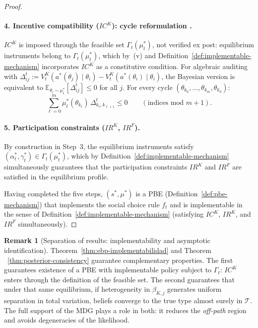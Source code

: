 \documentclass[ecta,nameyear,final,supplement]{econsocart}
\numberwithin{equation}{section}
\numberwithin{table}{section}
\theoremstyle{definition}
\newtheorem{remark}[theorem]{Remark}
\begin{document}
\begin{proof}
\paragraph{4. Incentive compatibility ($IC^K$): cycle reformulation
\citep{Rochet1987}.}
$IC^K$ is imposed through the feasible set $\Gamma_t(\mu_t^\ast)$, not verified
ex post: equilibrium instruments belong to $\Gamma_t(\mu_t^\ast)$, which by~(v)
and Definition~\ref{def:implementable-mechanism} incorporates $IC^K$ as a
constitutive condition. For algebraic auditing with
$\Delta_{ij}^t:=V^K_t(a^\ast(\theta_j)\mid\theta_i)
-V^K_t(a^\ast(\theta_i)\mid\theta_i)$, the Bayesian version is equivalent to
$\mathbb{E}_{\theta_i\sim\mu_t^\ast}[\Delta_{ij}^t]\le 0$ for all $j$.
For every cycle $(\theta_{k_0},\ldots,\theta_{k_m},\theta_{k_0})$:
\[
\sum_{\ell=0}^{m}
\mu_t^\ast(\theta_{k_\ell})\,\Delta_{k_\ell,k_{\ell+1}}^t\le 0
\qquad(\text{indices mod }m+1).
\]

\paragraph{5. Participation constraints ($IR^K$, $IR^F$).}
By construction in Step~3, the equilibrium instruments satisfy $(\alpha_t^\ast,\gamma_t^\ast)\in\Gamma_t(\mu_t^\ast)$,
which by Definition~\ref{def:implementable-mechanism} simultaneously guarantees that the participation constraints $IR^K$ and $IR^F$ are satisfied in the
equilibrium profile.

Having completed the five steps, $(s^\ast,\mu^\ast)$ is a PBE (Definition~\ref{def:pbe-mechanism}) that implements
the social choice rule $f_t$ and is implementable in the sense of Definition~\ref{def:implementable-mechanism} (satisfying $IC^K$, $IR^K$, and $IR^F$ simultaneously).
\end{proof}

\begin{remark}[Separation of results: implementability and asymptotic identification]
Theorem~\ref{thm:ebp-implementabilidad} and Theorem
~\ref{thm:posterior-consistency} guarantee complementary properties. The first
guarantees existence of a PBE with implementable policy subject to
$\Gamma_t$: $IC^K$ enters through the definition of the feasible set. The
second guarantees that under that same equilibrium, if heterogeneity in
$\beta_{K,j}$ generates uniform separation in total variation, beliefs converge
to the true type almost surely in $\mathcal{T}$. The full support of the MDG
plays a role in both: it reduces the \emph{off-path} region and avoids
degeneracies of the likelihood.
\end{remark}
\end{document}
